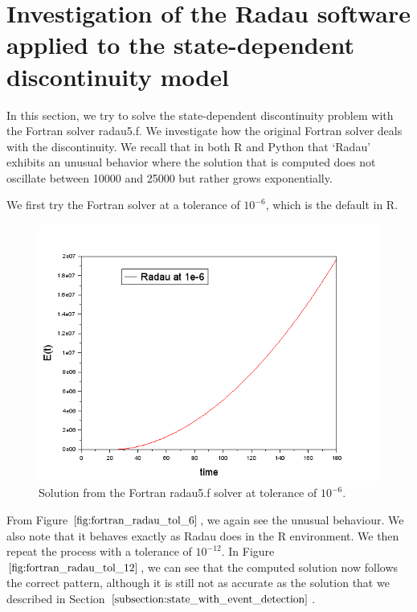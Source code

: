 
\section{Investigation of the Radau software applied to the state-dependent discontinuity model}
\label{section:fortran_inaccuracies}

In this section, we try to solve the state-dependent discontinuity problem with the Fortran solver radau5.f. We investigate how the original Fortran solver deals with the discontinuity. We recall that in both R and Python that `Radau' exhibits an unusual behavior where the solution that is computed does not oscillate between 10000 and 25000 but rather grows exponentially. 


We first try the Fortran solver at a tolerance of $10^{-6}$, which is the default in R.
\begin{figure}[h]
\centering
\includegraphics[width=0.7\linewidth]{./figures/fortran_radau_tol_6}
\caption{Solution from the Fortran radau5.f solver at tolerance of $10^{-6}$.}
\label{fig:fortran_radau_tol_6}
\end{figure}

From Figure $\ref{fig:fortran_radau_tol_6}$, we again see the unusual behaviour. We also note that it behaves exactly as Radau does in the R environment. We then repeat the process with a tolerance of $10^{-12}$. In Figure $\ref{fig:fortran_radau_tol_12}$, we can see that the computed solution now follows the correct pattern, although it is still not as accurate as the solution that we described in Section $\ref{subsection:state_with_event_detection}$.

